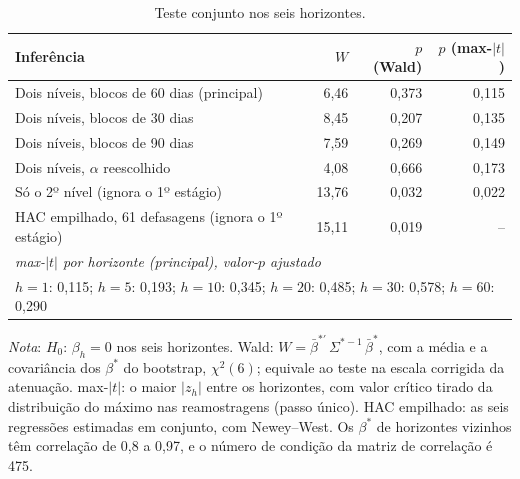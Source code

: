 \begin{table}[H]
\centering
\small
\caption{Teste conjunto nos seis horizontes.}
\label{tab:retlin-conjunto}
\begin{tabular}{lrrr}
\toprule
Inferência & $W$ & $p$ (Wald) & $p$ (max-$|t|$) \\
\midrule
Dois níveis, blocos de 60 dias (principal) & 6{,}46 & 0{,}373 & 0{,}115 \\
Dois níveis, blocos de 30 dias & 8{,}45 & 0{,}207 & 0{,}135 \\
Dois níveis, blocos de 90 dias & 7{,}59 & 0{,}269 & 0{,}149 \\
Dois níveis, $\alpha$ reescolhido & 4{,}08 & 0{,}666 & 0{,}173 \\
Só o 2º nível (ignora o 1º estágio) & 13{,}76 & 0{,}032 & 0{,}022 \\
HAC empilhado, 61 defasagens (ignora o 1º estágio) & 15{,}11 & 0{,}019 & -- \\
\midrule
\multicolumn{4}{l}{\textit{max-$|t|$ por horizonte (principal), valor-$p$ ajustado}} \\
\multicolumn{4}{l}{$h = 1$: 0{,}115; $h = 5$: 0{,}193; $h = 10$: 0{,}345; $h = 20$: 0{,}485; $h = 30$: 0{,}578; $h = 60$: 0{,}290} \\
\bottomrule
\end{tabular}
\par\smallskip
\parbox{0.95\linewidth}{\footnotesize\textit{Nota}: $H_0$: $\beta_h = 0$ nos seis horizontes. Wald: $W = \bar\beta^{*\prime}\,\Sigma^{*-1}\,\bar\beta^*$, com a média e a covariância dos $\beta^*$ do bootstrap, $\chi^2(6)$; equivale ao teste na escala corrigida da atenuação. max-$|t|$: o maior $|z_h|$ entre os horizontes, com valor crítico tirado da distribuição do máximo nas reamostragens (passo único). HAC empilhado: as seis regressões estimadas em conjunto, com Newey--West. Os $\beta^*$ de horizontes vizinhos têm correlação de 0,8 a 0,97, e o número de condição da matriz de correlação é 475.}
\end{table}
